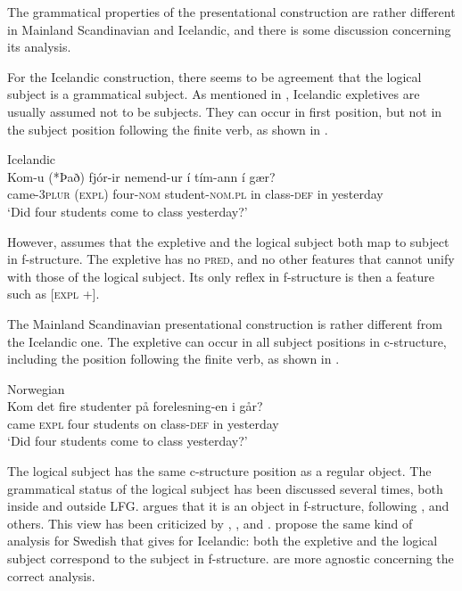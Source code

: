 \documentclass[output=paper,hidelinks]{langscibook}
\begin{document}
\noindent The grammatical properties of the presentational construction are rather different in Mainland Scandinavian and Icelandic, and there is some discussion concerning its analysis.

 For the Icelandic construction, there seems to be agreement that the logical subject is a grammatical subject. As mentioned in , Icelandic expletives are usually assumed not to be subjects. They can occur in first position, but not in the subject position following the finite verb, as shown in .



\ea\label{ex:Scandinavian:50} Icelandic \citep[313]{Thrainsson07}\\
\gll
 Kom-u {(*\MakeUppercase{þ}}{að)} {fjór-ir} {nemend-ur} {í} {tím-ann} {í} {gær?}\\
 came-\textsc{3plur} (\textsc{expl)} four-\textsc{nom} student-\textsc{nom.pl} in class-\textsc{def} in yesterday \\
\glt `Did four students come to class yesterday?'\z

\noindent However, \citet{Sells05} assumes that the expletive and the logical subject both map to subject in f-structure. The expletive has no \textsc{pred}, and no other features that cannot unify with those of the logical subject. Its only reflex in f-structure is then a feature such as [\textsc{expl} +].

\hspace*{-3.8pt}The Mainland Scandinavian presentational construction is rather different from the Icelandic one. The expletive can occur in all subject positions in c-structure, including the position following the finite verb, as shown in .



\ea\label{ex:Scandinavian:51} Norwegian\\
\gll
 {Kom} {det} {fire} {studenter} {på} {forelesning-en} {i} {går?}\\
 came \textsc{expl} four students on class-\textsc{def} in yesterday \\
\glt `Did four students come to class yesterday?'\z

\noindent The logical subject has the same c-structure position as a regular object. The grammatical status of the logical subject has been discussed several times, both inside and outside LFG. \citet{Lodrup99c,Lodrup20}  argues that it is an object in f-structure, following \citet{Askedal82}, \citet{Platzack83} and others. This view has been criticized by \citet{BV05}, \citet{ZEM17}, and \citet{HB20}. \citet{BV05} propose the same kind of analysis for Swedish that \citet{Sells05} gives for Icelandic: both the expletive and the logical subject correspond to the subject in f-structure. \citet{ZEM17} are more agnostic concerning the correct analysis.
\end{document}

